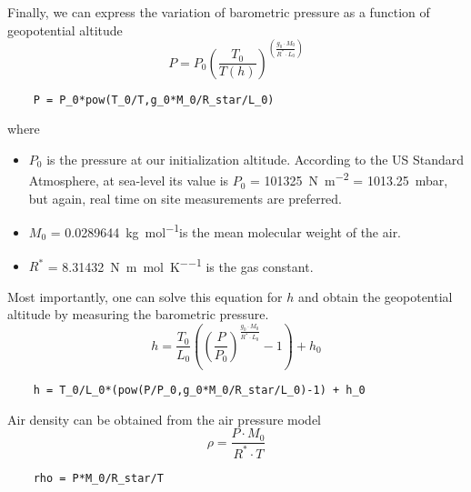 Finally, we can express the variation of barometric pressure as a function of geopotential altitude
\begin{equation}
	P = P_0\left( \frac{T_{0}}{T(h)} \right) ^ {\left( \frac{g_0 \cdot M_0}{R^* \cdot L_{0}} \right)}
\end{equation}

\begin{lstlisting}
	P = P_0*pow(T_0/T,g_0*M_0/R_star/L_0)
\end{lstlisting}

where
\begin{itemize}
	\item $P_0$ is the pressure at our initialization altitude. According to the US Standard Atmosphere, at sea-level its value is $P_0$ = \SI{101325}{\newton\per\square\meter} = \SI{1013.25}{\milli\bar}, but again, real time on site measurements are preferred.
	\item $M_0$ = \SI{0.0289644}{\kilogram\per\mole}is the mean molecular weight of the air.
	\item $R^*$ = \SI{8.31432}{\newton\meter\per\mole\per\kelvin} is the gas constant.
\end{itemize}

Most importantly, one can solve this equation for $h$ and obtain the geopotential altitude by measuring the barometric pressure.
\begin{equation}
	h = \frac{T_0}{L_0}	\left( \left(\frac{P}{P_0}\right)^{\frac{g_0\cdot M_0}{R^* \cdot L_0}} -1\right) + h_0
\end{equation}

\begin{lstlisting}
	h = T_0/L_0*(pow(P/P_0,g_0*M_0/R_star/L_0)-1) + h_0
\end{lstlisting}

Air density can be obtained from the air pressure model
\begin{equation}
	\rho = \frac{P \cdot M_0}{R^* \cdot T}
\end{equation}

\begin{lstlisting}
	rho = P*M_0/R_star/T
\end{lstlisting}
